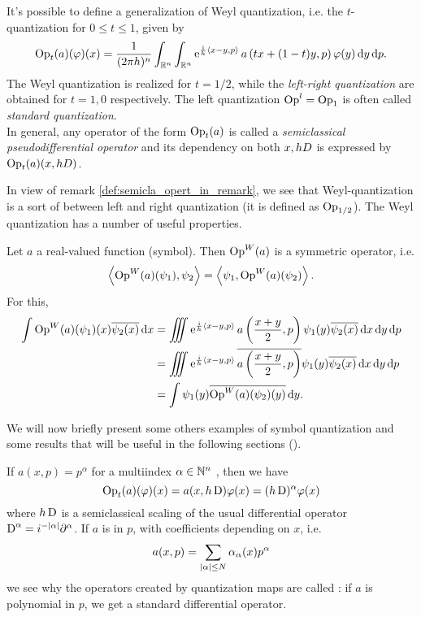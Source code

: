 \begin{remark}
\label{def:semicla_opert_in_remark}
It's possible to define a generalization of Weyl quantization, i.e. the $t$-quantization for $0\leq t\leq1$, given by
\[
\operatorname{Op}_{t}(a)(\varphi)(x)=\frac{1}{(2\pi h)^{n}}\int_{\mathbb{R}^{n}}\int_{\mathbb{R}^{n}}\mathrm{e}^{\frac{\mathrm{i}}{h}\left< x-y,p\right>}\, a\left(tx+(1-t)y,p\right)\varphi(y)\mathop{}\!\mathrm{d} y\mathop{}\!\mathrm{d} p.
\]
The Weyl quantization is realized for $t=1/2$, while the \emph{left-right quantization} are obtained for $t=1,0$ respectively. The left quantization $\operatorname{Op}^{l}=\operatorname{Op}_{1}$ is often called \emph{standard quantization}.\\
In general, any operator of the form $\operatorname{Op}_{t}(a)$ is called a \emph{semiclassical pseudodifferential operator} and its dependency on both $x,h D$ is expressed by $\operatorname{Op}_{t}(a)(x,h D)$.
\end{remark}


In view of remark \ref{def:semicla_opert_in_remark}, we see that Weyl-quantization is a sort of  between left and right quantization (it is defined as $\operatorname{Op}_{1/2}$). The Weyl quantization has a number of useful properties.

\begin{nese}
\label{ese:weyl_sends_real_to_syummetric}
Let $a$ a real-valued function (symbol). Then $\operatorname{Op}^{W}(a)$ is a symmetric operator, i.e.
\[
\left< \operatorname{Op}^{W}(a)(\psi_{1}),\psi_{2}\right>=\left< \psi_{1},\operatorname{Op}^{W}(a)(\psi_{2})\right>.
\]
For this,
\begin{align*}
\int\Op^{W}(a)(\psi_{1})(x)\overline{\psi_{2}(x)}\dd x&=
\iiint\e^{\frac{\imi}{\planck}\pscl{x-y}{p}}\, a\left(\frac{x+y}{2},p\right)\psi_{1}(y)\overline{\psi_{2}(x)}\dd x\dd y\dd p\\
&=\iiint\e^{\frac{\imi}{\planck}\pscl{x-y}{p}}\, \overline{a\left(\frac{x+y}{2},p\right)}\psi_{1}(y)\overline{\psi_{2}(x)}\dd x\dd y\dd p \\
&= \int\psi_{1}(y)\overline{\Op^{W}(a)(\psi_{2})(y)}\dd y.
\end{align*}
\end{nese} 

We will now briefly present some others examples of symbol quantization and some results that will be useful in the following sections (\cite{Zworski:semic}).

\begin{nese}
If $a(x,p)=p^{{\alpha}}$ for a multiindex ${\alpha}\in\mathbb{N}^{n}$ , then we have
\[
\operatorname{Op}_{t}(a)(\varphi)(x)=a(x,h \operatorname{D})\varphi(x)=(h \operatorname{D})^{{\alpha}}\varphi(x) 
\]
where $h\operatorname{D}$ is a semiclassical scaling of the usual differential operator $\operatorname{D}^{{\alpha}}=i^{-\left| {\alpha}\right|}\partial^{{\alpha}}$. If $a$ is  in $p$, with coefficients depending on $x$, i.e.
\[
a(x,p)=\sum_{\left| {\alpha}\right|\leq N}\alpha_{{\alpha}}(x)p^{{\alpha}}
\]
we see why the operators created by quantization maps are called : if $a$ is polynomial in $p$, we get a standard differential operator.
\end{nese}

